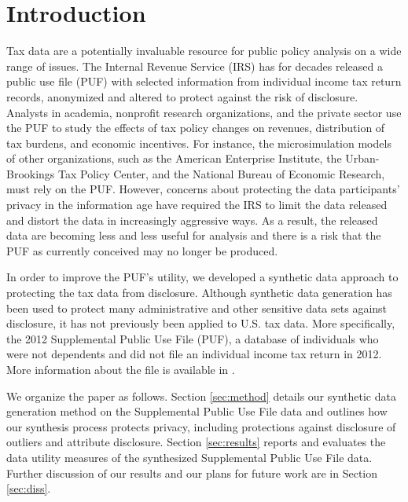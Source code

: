 \documentclass[11pt,runningheads,oribibl]{llncs}
\begin{document}
\section{Introduction}\label{sec:intro}

Tax data are a potentially invaluable resource for public policy analysis on a wide range of issues. The Internal Revenue Service (IRS) has for decades released a public use file (PUF) with selected information from individual income tax return records, anonymized and altered to protect against the risk of disclosure. Analysts in academia, nonprofit research organizations, and the private sector use the PUF to study the effects of tax policy changes on revenues, distribution of tax burdens, and economic incentives. For instance, the microsimulation models of other organizations, such as the American Enterprise Institute, the Urban-Brookings Tax Policy Center, and the National Bureau of Economic Research, must rely on the PUF. However, concerns about protecting the data participants’ privacy in the information age have required the IRS to limit the data released and distort the data in increasingly aggressive ways. As a result, the released data are becoming less and less useful for analysis and there is a risk that the PUF as currently conceived may no longer be produced. 

In order to improve the PUF's utility, we developed a synthetic data approach to protecting the tax data from disclosure. Although synthetic data generation has been used to protect many administrative and other sensitive data sets against disclosure, it has not previously been applied to U.S. tax data. More specifically, the 2012 Supplemental Public Use File (PUF), a database of individuals who were not dependents and did not file an individual income tax return in 2012. More information about the file is available in \cite{irs2019}. 

We organize the paper as follows. Section \ref{sec:method} details our synthetic data generation method on the Supplemental Public Use File data and outlines how our synthesis process protects privacy, including protections against disclosure of outliers and attribute disclosure. Section \ref{sec:results} reports and evaluates the data utility measures of the synthesized Supplemental Public Use File data. Further discussion of our results and our plans for future work are in Section \ref{sec:diss}.
\end{document}

